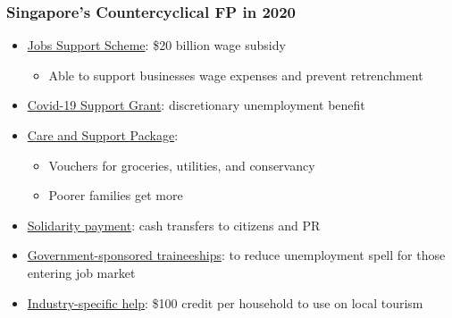 \documentclass{article}
\begin{document}
\begin{multicols}{2}
\subsubsection{Singapore's Countercyclical FP in 2020}
\begin{itemize}
	\item \underline{Jobs Support Scheme}: \$20 billion wage subsidy
	\begin{itemize}
		\item Able to support businesses wage expenses and prevent retrenchment
	\end{itemize}
    \item \underline{Covid-19 Support Grant}: discretionary unemployment benefit
    \item \underline{Care and Support Package}:
    \begin{itemize}
    	\item Vouchers for groceries, utilities, and conservancy
    	\item Poorer families get more
    \end{itemize}
    \item \underline{Solidarity payment}: cash transfers to citizens and PR
    \item \underline{Government-sponsored traineeships}: to reduce unemployment spell for those entering job market
    \item \underline{Industry-specific help}: \$100 credit per household to use on local tourism
\end{itemize}
\end{multicols}
\end{document}
